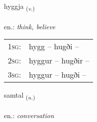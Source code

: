 \documentclass[frontgrid, backgrid]{flacards}\usepackage[]{graphicx}\usepackage[]{xcolor}
\begin{document}
\renewcommand{\flhead}{\vskip5pt \fboxsep=0pt {\small\bfseries\footnotesize Sagnorð | Verb}}
\renewcommand{\fcfoot}{\vskip5pt \fboxsep=0pt \hspace{2pt}{\small\bfseries\footnotesize 2K}}

\renewcommand{\blhead}{\vskip5pt {\small\bfseries\footnotesize Sagnorð | Verb }}
\renewcommand{\bcfoot}{\vskip5pt \hspace{2pt}{\small\bfseries\footnotesize 2K}}


{hyggja \small{\textsubscript{(\textit{v.})}} \\[1ex] %
\textphonetic{[hɪca]} \\
en.: \emph{think, believe} \\  [2ex]
\renewcommand*{\arraystretch}{0.8}
\begin{tabular}{p{1cm}l}
\textsc{1sg}: & hygg -- hugði --  \\ 
\textsc{2sg}: & hyggur -- hugðir --  \\ 
\textsc{3sg}: & hyggur -- hugði --  \\ 
\end{tabular}
}

\renewcommand{\flhead}{\vskip5pt \fboxsep=0pt {\small\bfseries\footnotesize Nafnorð | Noun}}
\renewcommand{\fcfoot}{\vskip5pt \fboxsep=0pt \hspace{2pt}{\small\bfseries\footnotesize 2K}}

\renewcommand{\blhead}{\vskip5pt {\small\bfseries\footnotesize Nafnorð | Noun }}
\renewcommand{\bcfoot}{\vskip5pt \hspace{2pt}{\small\bfseries\footnotesize 2K}}


{samtal \small{\textsubscript{(\textit{n.})}} \\[1ex] %
\textphonetic{[samtʰal]} \\
en.: \emph{conversation} \\  [2ex]
\renewcommand*{\arraystretch}{0.8}
}
\end{document}
